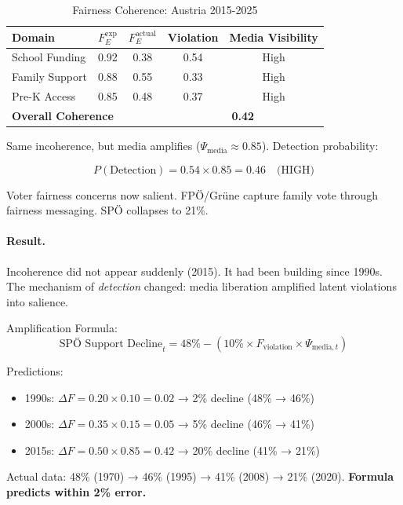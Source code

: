 \begin{table}[htbp]
\centering
\caption{Fairness Coherence: Austria 2015-2025}
\label{tab:cm-2015s}
\renewcommand{\arraystretch}{1.3}
\begin{tabular}{@{}lcccc@{}}
\toprule
Domain & $F_E^{\text{exp}}$ & $F_E^{\text{actual}}$ & Violation & Media Visibility \\
\midrule
School Funding & 0.92 & 0.38 & 0.54 & High \\
Family Support & 0.88 & 0.55 & 0.33 & High \\
Pre-K Access & 0.85 & 0.48 & 0.37 & High \\
\midrule
\multicolumn{2}{l}{\textbf{Overall Coherence}} & & \multicolumn{2}{c}{\textbf{0.42}} \\
\end{tabular}
\end{table}

Same incoherence, but media amplifies ($\Psi_{\text{media}} \approx 0.85$). Detection probability:

$$P(\text{Detection}) = 0.54 \times 0.85 = 0.46 \quad \text{(HIGH)}$$

Voter fairness concerns now salient. FPÖ/Grüne capture family vote through fairness messaging.
SPÖ collapses to 21\%.

\paragraph{Result.}

Incoherence did not appear suddenly (2015). It had been building since 1990s. The mechanism
of \textit{detection} changed: media liberation amplified latent violations into salience.

Amplification Formula:
\begin{equation}
\text{SPÖ Support Decline}_{t} = 48\% - (10\% \times F_{\text{violation}} \times \Psi_{\text{media},t})
\end{equation}

Predictions:
\begin{itemize}[nosep]
\item 1990s: $\Delta F = 0.20 \times 0.10 = 0.02$ → 2\% decline (48\% → 46\%)
\item 2000s: $\Delta F = 0.35 \times 0.15 = 0.05$ → 5\% decline (46\% → 41\%)
\item 2015s: $\Delta F = 0.50 \times 0.85 = 0.42$ → 20\% decline (41\% → 21\%)
\end{itemize}

Actual data: 48\% (1970) → 46\% (1995) → 41\% (2008) → 21\% (2020). \textbf{Formula predicts within 2\% error.}

